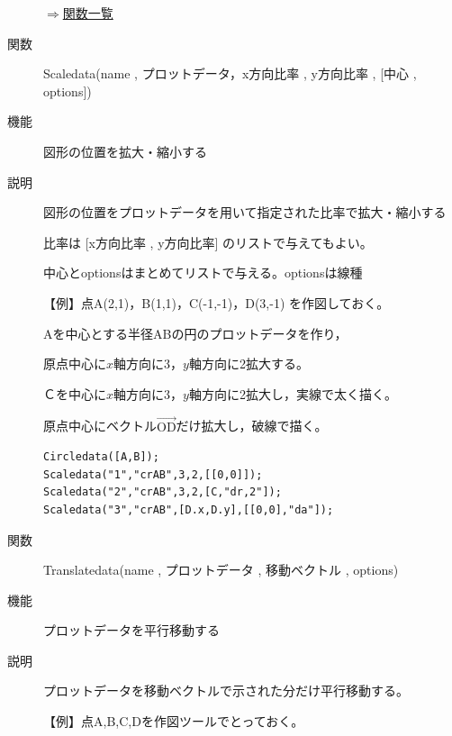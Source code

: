 \documentclass[papersize,a4paper,12pt,uplatex]{jsarticle}
\begin{document}
\begin{description}
\begin{flushright}\hyperlink{functionlist}{$\Rightarrow$関数一覧}\end{flushright}

\vspace{\baselineskip}
\hypertarget{scaledata}{}
\item[関数]Scaledata(name , プロットデータ，x方向比率 , y方向比率 , [中心 , options])
\item[機能]図形の位置を拡大・縮小する
\item[説明]図形の位置をプロットデータを用いて指定された比率で拡大・縮小する

比率は [x方向比率 , y方向比率] のリストで与えてもよい。

中心とoptionsはまとめてリストで与える。optionsは線種

\vspace{\baselineskip}
【例】点A(2,1)，B(1,1)，C(-1,-1)，D(3,-1) を作図しておく。

 Aを中心とする半径ABの円のプロットデータを作り，

原点中心に$x$軸方向に3，$y$軸方向に2拡大する。

Ｃを中心に$x$軸方向に3，$y$軸方向に2拡大し，実線で太く描く。

原点中心にベクトル$\overrightarrow{\mathrm{OD}} $だけ拡大し，破線で描く。
\begin{verbatim}
Circledata([A,B]);
Scaledata("1","crAB",3,2,[[0,0]]);
Scaledata("2","crAB",3,2,[C,"dr,2"]);
Scaledata("3","crAB",[D.x,D.y],[[0,0],"da"]);
\end{verbatim}

\vspace{0mm}
 \begin{center}  \end{center}


\vspace{\baselineskip}
\hypertarget{translatedata}{}
\item[関数]Translatedata(name , プロットデータ , 移動ベクトル , options)
\item[機能]プロットデータを平行移動する
\item[説明]プロットデータを移動ベクトルで示された分だけ平行移動する。

\vspace{\baselineskip}
【例】点A,B,C,Dを作図ツールでとっておく。


\end{description}
\end{document}
